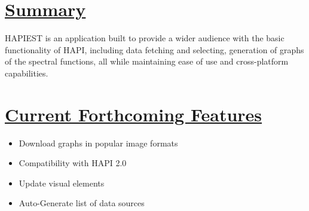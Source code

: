 \documentclass[a0,landscape]{a0poster}
\begin{document}
\begin{multicols}{3}
\section*{\underline{Summary}}
HAPIEST is an application built to provide a wider audience with the basic functionality of HAPI, including data fetching and selecting, generation of graphs of the spectral functions, all while maintaining ease of use and cross-platform capabilities.

\section*{\underline{Current Forthcoming Features}}

\begin{itemize}
\item Download graphs in popular image formats
\item Compatibility with HAPI 2.0
\item Update visual elements
\item Auto-Generate list of data sources
\end{itemize}

\end{multicols}
\end{document}
